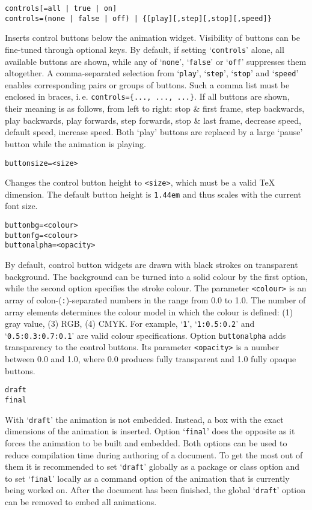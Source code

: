 \documentclass[a4paper]{article}
\begin{document}
\begin{verbatim}
controls[=all | true | on]
controls=(none | false | off) | {[play][,step][,stop][,speed]}
\end{verbatim}
Inserts control buttons below the animation widget. Visibility of buttons can be fine-tuned through optional keys. By default, if setting `\verb+controls+' alone, all available buttons are shown, while any of `\verb+none+', `\verb+false+' or `\verb+off+' suppresses them altogether. A comma-separated selection from `\verb+play+', `\verb+step+', `\verb+stop+' and `\verb+speed+' enables corresponding pairs or groups of buttons. Such a comma list must be enclosed in braces, i.\,e. \verb+controls={..., ..., ...}+. If all buttons are shown, their meaning is as follows, from left to right: stop \& first frame, step backwards, play backwards, play forwards, step forwards, stop \& last frame, decrease speed, default speed, increase speed. Both `play' buttons are replaced by a large `pause' button while the animation is playing.
\begin{verbatim}
buttonsize=<size>
\end{verbatim}
Changes the control button height to \verb+<size>+, which must be a valid \TeX{} dimension. The default button height is \verb+1.44em+ and thus scales with the current font size.
\begin{verbatim}
buttonbg=<colour>
buttonfg=<colour>
buttonalpha=<opacity>
\end{verbatim}
By default, control button widgets are drawn with black strokes on transparent background. The background can be turned into a solid colour by the first option, while the second option specifies the stroke colour. The parameter \verb+<colour>+ is an array of colon-(\verb+:+)-separated numbers in the range from 0.0 to 1.0. The number of array elements determines the colour model in which the colour is defined: (1) gray value, (3) RGB, (4) CMYK. For example, `\verb+1+', `\verb+1:0.5:0.2+' and `\verb+0.5:0.3:0.7:0.1+' are valid colour specifications. Option \verb+buttonalpha+ adds transparency to the control buttons. Its parameter \verb+<opacity>+ is a number between 0.0 and 1.0, where 0.0 produces fully transparent and 1.0 fully opaque buttons.
\begin{verbatim}
draft
final
\end{verbatim}
With `\verb+draft+' the animation is not embedded. Instead, a box with the exact dimensions of the animation is inserted. Option `\verb+final+' does the opposite as it forces the animation to be built and embedded. Both options can be used to reduce compilation time during authoring of a document. To get the most out of them it is recommended to set `\verb+draft+' globally as a package or class option and to set `\verb+final+' locally as a command option of the animation that is currently being worked on. After the document has been finished, the global `\verb+draft+' option can be removed to embed all animations.
\end{document}
